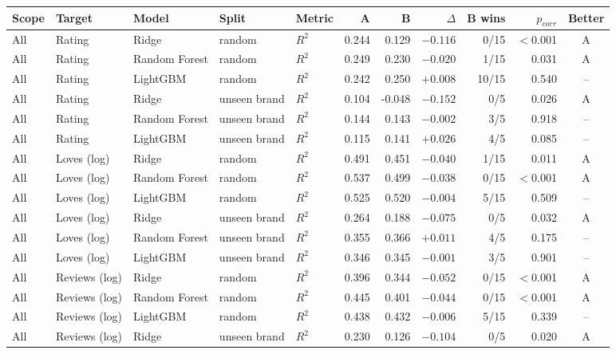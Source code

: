 \begin{table}[htbp]
\centering
\small
\begin{tabular}{|l|l|l|l|l|r|r|r|r|r|c|}
\hline
\rowcolor{headfill} \textbf{Scope} & \textbf{Target} & \textbf{Model} & \textbf{Split} & \textbf{Metric} & \textbf{A} & \textbf{B} & \textbf{$\Delta$} & \textbf{B wins} & \textbf{$p_{corr}$} & \textbf{Better} \\
\hline
All & Rating & Ridge & random & $R^2$ & 0.244 & 0.129 & $-0.116$ & 0/15 & $<$0.001 & A \\
\hline
All & Rating & Random Forest & random & $R^2$ & 0.249 & 0.230 & $-0.020$ & 1/15 & 0.031 & A \\
\hline
All & Rating & LightGBM & random & $R^2$ & 0.242 & 0.250 & $+0.008$ & 10/15 & 0.540 & -- \\
\hline
All & Rating & Ridge & unseen brand & $R^2$ & 0.104 & -0.048 & $-0.152$ & 0/5 & 0.026 & A \\
\hline
All & Rating & Random Forest & unseen brand & $R^2$ & 0.144 & 0.143 & $-0.002$ & 3/5 & 0.918 & -- \\
\hline
All & Rating & LightGBM & unseen brand & $R^2$ & 0.115 & 0.141 & $+0.026$ & 4/5 & 0.085 & -- \\
\hline
All & Loves (log) & Ridge & random & $R^2$ & 0.491 & 0.451 & $-0.040$ & 1/15 & 0.011 & A \\
\hline
All & Loves (log) & Random Forest & random & $R^2$ & 0.537 & 0.499 & $-0.038$ & 0/15 & $<$0.001 & A \\
\hline
All & Loves (log) & LightGBM & random & $R^2$ & 0.525 & 0.520 & $-0.004$ & 5/15 & 0.509 & -- \\
\hline
All & Loves (log) & Ridge & unseen brand & $R^2$ & 0.264 & 0.188 & $-0.075$ & 0/5 & 0.032 & A \\
\hline
All & Loves (log) & Random Forest & unseen brand & $R^2$ & 0.355 & 0.366 & $+0.011$ & 4/5 & 0.175 & -- \\
\hline
All & Loves (log) & LightGBM & unseen brand & $R^2$ & 0.346 & 0.345 & $-0.001$ & 3/5 & 0.901 & -- \\
\hline
All & Reviews (log) & Ridge & random & $R^2$ & 0.396 & 0.344 & $-0.052$ & 0/15 & $<$0.001 & A \\
\hline
All & Reviews (log) & Random Forest & random & $R^2$ & 0.445 & 0.401 & $-0.044$ & 0/15 & $<$0.001 & A \\
\hline
All & Reviews (log) & LightGBM & random & $R^2$ & 0.438 & 0.432 & $-0.006$ & 5/15 & 0.339 & -- \\
\hline
All & Reviews (log) & Ridge & unseen brand & $R^2$ & 0.230 & 0.126 & $-0.104$ & 0/5 & 0.020 & A \\

\end{tabular}
\end{table}
